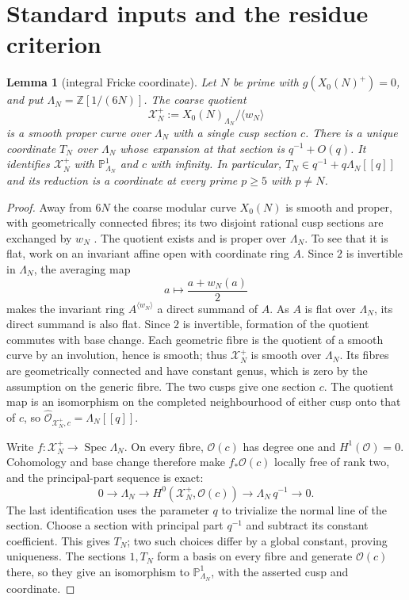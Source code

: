 \documentclass[11pt,a4paper]{article}
\numberwithin{equation}{section}
\newtheorem{lemma}[theorem]{Lemma}
\theoremstyle{definition}
\theoremstyle{remark}
\newcommand{\Z}{\mathbb Z}
\begin{document}
\section{Standard inputs and the residue criterion}\label{sec:imports}

\begin{lemma}[integral Fricke coordinate]\label{lem:coordinate}
Let $N$ be prime with $g(X_0(N)^+)=0$, and put
$\Lambda_N=\Z[1/(6N)]$. The coarse quotient
\[
\mathcal X_N^+:=X_0(N)_{\Lambda_N}/\langle w_N\rangle
\]
is a smooth proper curve over $\Lambda_N$ with a single cusp section $c$.
There is a unique coordinate $T_N$ over $\Lambda_N$ whose expansion at
that section is $q^{-1}+O(q)$. It identifies $\mathcal X_N^+$ with
$\mathbb P^1_{\Lambda_N}$ and $c$ with infinity. In particular,
$T_N\in q^{-1}+q\Lambda_N[[q]]$ and its reduction is a coordinate
at every prime $p\ge5$ with $p\ne N$.
\end{lemma}
\begin{proof}
Away from $6N$ the coarse modular curve $X_0(N)$ is smooth and proper,
with geometrically connected fibres; its two disjoint rational cusp
sections are exchanged by $w_N$ \citep{DR73,KM85}.
The quotient exists and is proper over $\Lambda_N$. To see that it is flat,
work on an invariant affine open with coordinate ring $A$. Since $2$ is
invertible in $\Lambda_N$, the averaging map
\[
a\longmapsto \frac{a+w_N(a)}{2}
\]
makes the invariant ring $A^{\langle w_N\rangle}$ a direct summand of $A$.
As $A$ is flat over $\Lambda_N$, its direct summand is also flat. Since $2$ is invertible,
formation of the quotient commutes with base change. Each geometric
fibre is the quotient of a smooth curve by an involution, hence is
smooth; thus $\mathcal X_N^+$ is smooth over $\Lambda_N$.
Its fibres are geometrically connected and have constant genus,
which is zero by the assumption on the generic fibre.
The two cusps give one section $c$. The quotient map is an isomorphism
on the completed neighbourhood of either cusp onto that of $c$, so
$\widehat{\mathcal O}_{\mathcal X_N^+,c}=\Lambda_N[[q]]$.

Write $f:\mathcal X_N^+\to\operatorname{Spec}\Lambda_N$.
On every fibre, $\mathcal O(c)$ has degree one and $H^1(\mathcal O)=0$.
Cohomology and base change therefore make $f_*\mathcal O(c)$ locally
free of rank two, and the principal-part sequence is exact:
\[
0\longrightarrow\Lambda_N\longrightarrow
H^0(\mathcal X_N^+,\mathcal O(c))
\longrightarrow\Lambda_N\,q^{-1}\longrightarrow0.
\]
The last identification uses the parameter $q$ to trivialize the
normal line of the section. Choose a section with principal part
$q^{-1}$ and subtract its constant coefficient. This gives $T_N$;
two such choices differ by a global constant, proving uniqueness.
The sections $1,T_N$ form a basis on every fibre and generate
$\mathcal O(c)$ there, so they give an isomorphism to
$\mathbb P^1_{\Lambda_N}$, with the asserted cusp and coordinate.
\end{proof}
\end{document}
